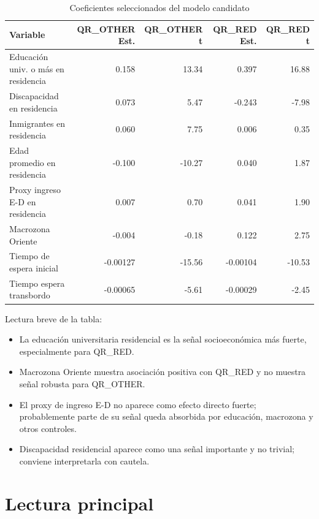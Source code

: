 \documentclass[11pt,letterpaper]{article}
\begin{document}
\begin{table}[htbp]
\centering
\caption{Coeficientes seleccionados del modelo candidato}
\small
\setlength{\tabcolsep}{5pt}
\begin{tabular}{p{5.4cm}rrrr}
\toprule
Variable & QR\_OTHER Est. & QR\_OTHER t & QR\_RED Est. & QR\_RED t \\
\midrule
Educación univ. o más en residencia & 0.158 & 13.34 & 0.397 & 16.88 \\
Discapacidad en residencia & 0.073 & 5.47 & -0.243 & -7.98 \\
Inmigrantes en residencia & 0.060 & 7.75 & 0.006 & 0.35 \\
Edad promedio en residencia & -0.100 & -10.27 & 0.040 & 1.87 \\
Proxy ingreso E-D en residencia & 0.007 & 0.70 & 0.041 & 1.90 \\
Macrozona Oriente & -0.004 & -0.18 & 0.122 & 2.75 \\
Tiempo de espera inicial & -0.00127 & -15.56 & -0.00104 & -10.53 \\
Tiempo espera transbordo & -0.00065 & -5.61 & -0.00029 & -2.45 \\
\bottomrule
\end{tabular}
\end{table}

Lectura breve de la tabla:
\begin{itemize}
    \item La educación universitaria residencial es la señal socioeconómica más fuerte, especialmente para QR\_RED.
    \item Macrozona Oriente muestra asociación positiva con QR\_RED y no muestra señal robusta para QR\_OTHER.
    \item El proxy de ingreso E-D no aparece como efecto directo fuerte; probablemente parte de su señal queda absorbida por educación, macrozona y otros controles.
    \item Discapacidad residencial aparece como una señal importante y no trivial; conviene interpretarla con cautela.
\end{itemize}

\section{Lectura principal}
\end{document}
